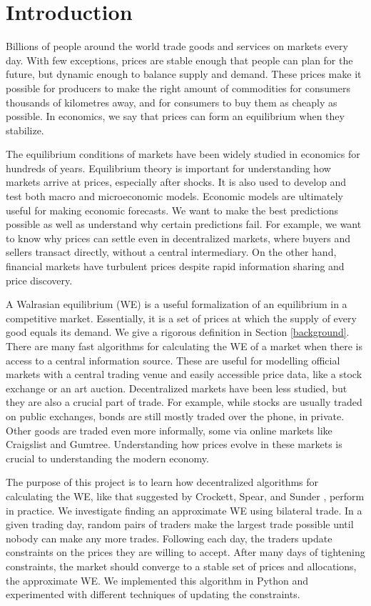\documentclass[12pt,a4paper,titlepage]{article}
\begin{document}
\tableofcontents
\newpage

\section{Introduction}
Billions of people around the world trade goods and services on markets every day.
With few exceptions, prices are stable enough that people can plan for the future, but dynamic enough to balance supply and demand.
These prices make it possible for producers to make the right amount of commodities for consumers thousands of kilometres away, and for consumers to buy them as cheaply as possible.
In economics, we say that prices can form an equilibrium when they stabilize.

The equilibrium conditions of markets have been widely studied in economics for hundreds of years.
Equilibrium theory is important for understanding how markets arrive at prices, especially after shocks. 
It is also used to develop and test both macro and microeconomic models. 
Economic models are ultimately useful for making economic forecasts.
We want to make the best predictions possible as well as understand why certain predictions fail.
For example, we want to know why prices can settle even in decentralized markets, where buyers and sellers transact directly, without a central intermediary.
On the other hand, financial markets have turbulent prices despite rapid information sharing and price discovery.

A Walrasian equilibrium (WE) is a useful formalization of an equilibrium in a competitive market.
Essentially, it is a set of prices at which the supply of every good equals its demand.
We give a rigorous definition in Section \ref{background}.
There are many fast algorithms for calculating the WE of a market when there is access to a central information source.
These are useful for modelling official markets with a central trading venue and easily accessible price data, like a stock exchange or an art auction.
Decentralized markets have been less studied, but they are also a crucial part of trade.
For example, while stocks are usually traded on public exchanges, bonds are still mostly traded over the phone, in private.
Other goods are traded even more informally, some via online markets like Craigslist and Gumtree.
Understanding how prices evolve in these markets is crucial to understanding the modern economy.

The purpose of this project is to learn how decentralized algorithms for calculating the WE, like that suggested by Crockett, Spear, and Sunder \cite{crockett}, perform in practice.
We investigate finding an approximate WE using bilateral trade.
In a given trading day, random pairs of traders make the largest trade possible until nobody can make any more trades. 
Following each day, the traders update constraints on the prices they are willing to accept.
After many days of tightening constraints, the market should converge to a stable set of prices and allocations, the approximate WE.
We implemented this algorithm in Python and experimented with different techniques of updating the constraints.
\end{document}
